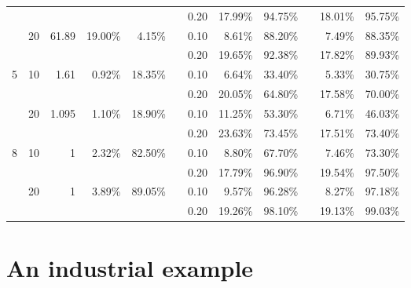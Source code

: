 \documentclass[]{interact}
\theoremstyle{plain}%
\theoremstyle{definition}
\theoremstyle{remark}
\begin{document}
\begin{table}[htbp]
\begin{tabular}{ccrrrrrrrrrr}
      &   &   &   &   &   &             0.20  & 17.99\% & 94.75\% &   & 18.01\% & 95.75\% \\
      & 20 &           61.89  & 19.00\% & 4.15\% &   &             0.10  & 8.61\% & 88.20\% &   & 7.49\% & 88.35\% \\
      &   &   &   &   &   &             0.20  & 19.65\% & 92.38\% &   & 17.82\% & 89.93\% \\
    5 & 10 & 1.61 & 0.92\% & 18.35\% &   &             0.10  & 6.64\% & 33.40\% &   & 5.33\% & 30.75\% \\
      &   &   &   &   &   &             0.20  & 20.05\% & 64.80\% &   & 17.58\% & 70.00\% \\
      & 20 & 1.095 & 1.10\% & 18.90\% &   &             0.10  & 11.25\% & 53.30\% &   & 6.71\% & 46.03\% \\
      &   &   &   &   &   &             0.20  & 23.63\% & 73.45\% &   & 17.51\% & 73.40\% \\
    8 & 10 & 1 & 2.32\% & 82.50\% &   &             0.10  & 8.80\% & 67.70\% &   & 7.46\% & 73.30\% \\
      &   &   &   &   &   &             0.20  & 17.79\% & 96.90\% &   & 19.54\% & 97.50\% \\
      & 20 & 1 & 3.89\% & 89.05\% &   &             0.10  & 9.57\% & 96.28\% &   & 8.27\% & 97.18\% \\
      &   &   &   &   &   &             0.20  & 19.26\% & 98.10\% &   & 19.13\% & 99.03\% \\
      \bottomrule
    \end{tabular}%
  \label{tab:addlabel}%
\end{table}%

\section{An industrial example}
\end{document}
